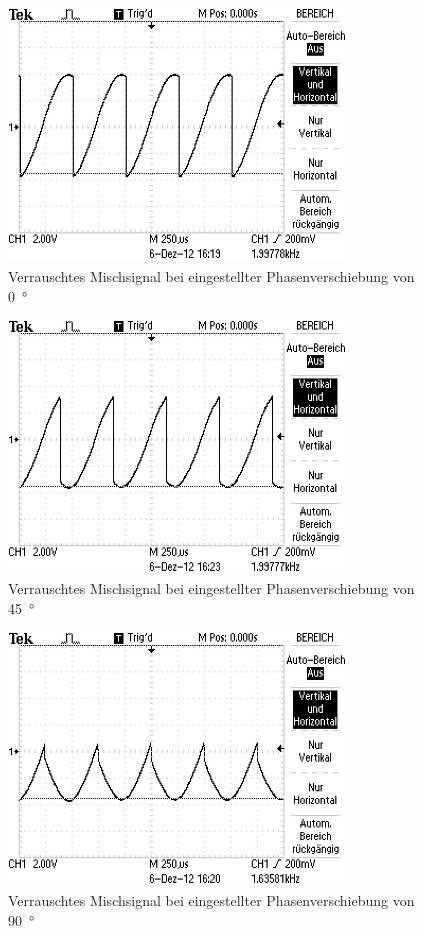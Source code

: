 \begin{figure}
  \centering
  \includegraphics[width=0.8\textwidth]{aufnahmen/phase_0_verrauscht.jpg}
  \caption{Verrauschtes Mischsignal bei eingestellter Phasenverschiebung
    von \SI{0}{\degree}}
  \label{fig:phase_0_verrauscht}
\end{figure}

\begin{figure}
  \centering
  \includegraphics[width=0.8\textwidth]{aufnahmen/phase_45_verrauscht.jpg}
  \caption{Verrauschtes Mischsignal bei eingestellter Phasenverschiebung
    von \SI{45}{\degree}}
  \label{fig:phase_45_verrauscht}
\end{figure}

\begin{figure}
  \centering
  \includegraphics[width=0.8\textwidth]{aufnahmen/phase_90_verrauscht.jpg}
  \caption{Verrauschtes Mischsignal bei eingestellter Phasenverschiebung
    von \SI{90}{\degree}}
  \label{fig:phase_90_verrauscht}
\end{figure}

